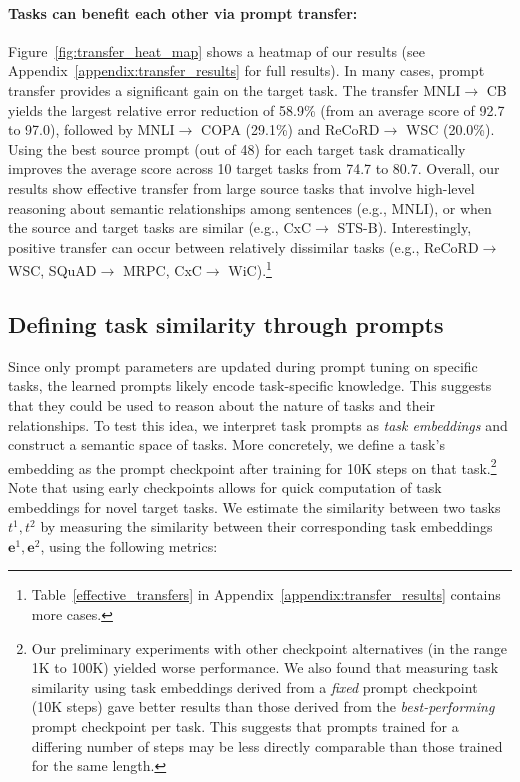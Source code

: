 \paragraph{Tasks can benefit each other via prompt transfer:} Figure~\ref{fig:transfer_heat_map} shows a heatmap of our results (see Appendix~\ref{appendix:transfer_results} for full results). In many cases, prompt transfer provides a significant gain on the target task. The transfer {\small \sc MNLI}$\rightarrow$ {\small \sc CB} yields the largest relative error reduction of 58.9\% (from an average score of 92.7 to 97.0), followed by {\small \sc MNLI}$\rightarrow$ {\small \sc COPA} (29.1\%) and {\small \sc ReCoRD}$\rightarrow$ {\small \sc WSC} (20.0\%). Using the best source prompt (out of 48) for each target task dramatically improves the average score across 10 target tasks from 74.7 to 80.7. Overall, our results show effective transfer from large source tasks that involve high-level reasoning about semantic relationships among sentences (e.g., {\small \sc MNLI}), or when the source and target tasks are similar (e.g., {\small \sc CxC}$\rightarrow$ {\small \sc STS-B}). Interestingly, positive transfer can occur between relatively dissimilar tasks (e.g., {\small \sc ReCoRD}$\rightarrow$ {\small \sc WSC}, {\small \sc SQuAD}$\rightarrow$ {\small \sc MRPC}, {\small \sc CxC}$\rightarrow$ {\small \sc WiC}).\footnote{Table~\ref{effective_transfers} in Appendix~\ref{appendix:transfer_results} contains more cases.} 
\subsection{Defining task similarity through prompts}
\label{sec:defining_similarity}

Since only prompt parameters are updated during prompt tuning on specific tasks, the learned prompts likely encode task-specific knowledge. This suggests that they could be used to reason about the nature of tasks and their relationships. To test this idea, we interpret task prompts as \textit{task embeddings} and construct a semantic space of tasks. More concretely, we define a task's embedding as the prompt checkpoint after training for 10K steps on that task.\footnote{Our preliminary experiments with other checkpoint alternatives (in the range 1K to 100K) yielded worse performance. We also found that measuring task similarity using task embeddings derived from a \emph{fixed} prompt checkpoint (10K steps) gave better results than those derived from the \emph{best-performing} prompt checkpoint per task. This suggests that prompts trained for a differing number of steps may be less directly comparable than those trained for the same length.} Note that using early checkpoints allows for quick computation of task embeddings for novel target tasks. We estimate the similarity between two tasks $t^{1}, t^{2}$ by measuring the similarity between their corresponding task embeddings $\bm{e}^{1}, \bm{e}^{2}$, using the following metrics:
